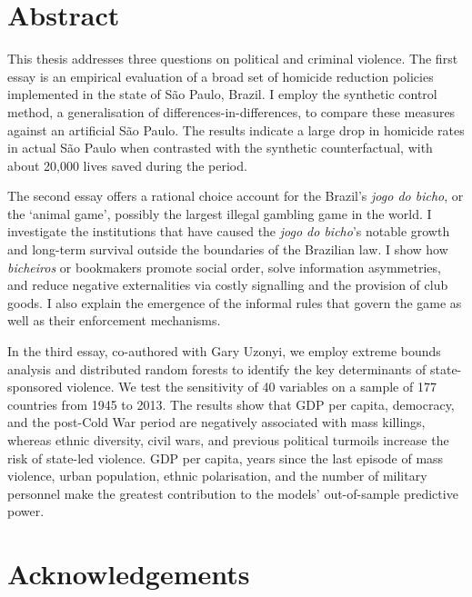 \documentclass[a4paper,12pt]{report}
\newcommand{\linespacing}{2}
\renewcommand{\baselinestretch}{\linespacing}
\begin{document}
\chapter*{Abstract}
\renewcommand{\baselinestretch}{\linespacing}
\small\normalsize

This thesis addresses three questions on political and criminal violence. The first essay is an empirical evaluation of a broad set of homicide reduction policies implemented in the state of São Paulo, Brazil. I employ the synthetic control method, a generalisation of differences-in-differences, to compare these measures against an artificial São Paulo. The results indicate a large drop in homicide rates in actual São Paulo when contrasted with the synthetic counterfactual, with about 20,000 lives saved during the period. 

The second essay offers a rational choice account for the Brazil's \textit{jogo do bicho}, or the `animal game', possibly the largest illegal gambling game in the world. I investigate the institutions that have caused the \textit{jogo do bicho}'s notable growth and long-term survival outside the boundaries of the Brazilian law. I show how \textit{bicheiros} or bookmakers promote social order, solve information asymmetries, and reduce negative externalities via costly signalling and the provision of club goods. I also explain the emergence of the informal rules that govern the game as well as their enforcement mechanisms. 

In the third essay, co-authored with Gary Uzonyi, we employ extreme bounds analysis and distributed random forests to identify the key determinants of state-sponsored violence. We test the sensitivity of 40 variables on a sample of 177 countries from 1945 to 2013. The results show that GDP per capita, democracy, and the post-Cold War period are negatively associated with mass killings, whereas ethnic diversity, civil wars, and previous political turmoils increase the risk of state-led violence. GDP per capita, years since the last episode of mass violence, urban population, ethnic polarisation, and the number of military personnel make the greatest contribution to the models' out-of-sample predictive power.


\chapter*{Acknowledgements}
\renewcommand{\baselinestretch}{\linespacing}
\small\normalsize
\end{document}

